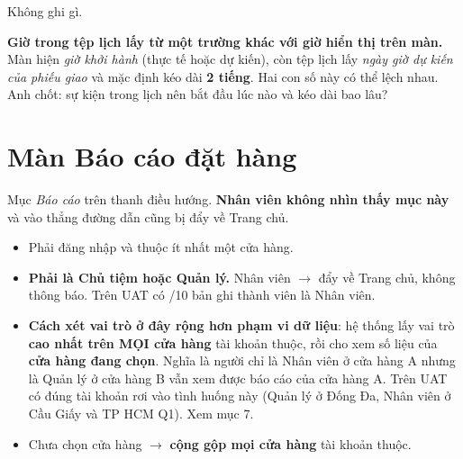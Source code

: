 \mghi

Không ghi gì.

\mhoi

\begin{ask}
\textbf{Giờ trong tệp lịch lấy từ một trường khác với giờ hiển thị trên màn.} Màn hiện
\emph{giờ khởi hành} (thực tế hoặc dự kiến), còn tệp lịch lấy \emph{ngày giờ dự kiến của phiếu
giao} và mặc định kéo dài \textbf{2 tiếng}. Hai con số này có thể lệch nhau. Anh chốt: sự kiện
trong lịch nên bắt đầu lúc nào và kéo dài bao lâu?
\end{ask}

\section{Màn Báo cáo đặt hàng}
\medskip

\mvao

Mục \emph{Báo cáo} trên thanh điều hướng. \textbf{Nhân viên không nhìn thấy mục này} và vào
thẳng đường dẫn cũng bị đẩy về Trang chủ.

\mai

\begin{itemize}[leftmargin=*]
  \item Phải đăng nhập và thuộc ít nhất một cửa hàng.
  \item \textbf{Phải là Chủ tiệm hoặc Quản lý.} Nhân viên $\rightarrow$ đẩy về Trang chủ, không
        thông báo. Trên UAT có /10 bản ghi thành viên là Nhân viên.
  \item \textbf{Cách xét vai trò ở đây rộng hơn phạm vi dữ liệu}: hệ thống lấy vai trò
        \textbf{cao nhất trên MỌI cửa hàng} tài khoản thuộc, rồi cho xem số liệu của
        \textbf{cửa hàng đang chọn}. Nghĩa là người chỉ là Nhân viên ở cửa hàng A nhưng là Quản
        lý ở cửa hàng B vẫn xem được báo cáo của cửa hàng A. Trên UAT có đúng  tài khoản
        rơi vào tình huống này (Quản lý ở Đống Đa, Nhân viên ở Cầu Giấy và TP HCM Q1). Xem mục 7.
  \item Chưa chọn cửa hàng $\rightarrow$ \textbf{cộng gộp mọi cửa hàng} tài khoản thuộc.
\end{itemize}

\mhien

